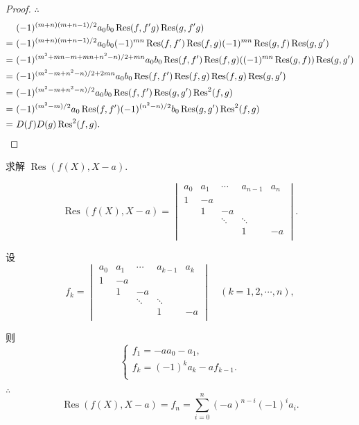 \documentclass[UTF8]{ctexart}
\begin{document}
\begin{proof}
    $\therefore$
    \begin{align*}
        & (-1)^{(m+n)(m+n-1)/2}a_0b_0\operatorname{Res}(f,f'g)\operatorname{Res}(g,f'g) \\
        =\  & (-1)^{(m+n)(m+n-1)/2}a_0b_0(-1)^{mn}\operatorname{Res}(f,f')\operatorname{Res}(f,g)(-1)^{mn}\operatorname{Res}(g,f)\operatorname{Res}(g,g') \\
        =\  & (-1)^{(m^2+mn-m+mn+n^2-n)/2+mn}a_0b_0\operatorname{Res}(f,f')\operatorname{Res}(f,g)((-1)^{mn}\operatorname{Res}(g,f))\operatorname{Res}(g,g') \\
        =\  & (-1)^{(m^2-m+n^2-n)/2+2mn}a_0b_0\operatorname{Res}(f,f')\operatorname{Res}(f,g)\operatorname{Res}(f,g)\operatorname{Res}(g,g') \\
        =\  & (-1)^{(m^2-m+n^2-n)/2}a_0b_0\operatorname{Res}(f,f')\operatorname{Res}(g,g')\operatorname{Res}^2(f,g) \\
        =\  & (-1)^{(m^2-m)/2}a_0\operatorname{Res}(f,f')(-1)^{(n^2-n)/2}b_0\operatorname{Res}(g,g')\operatorname{Res}^2(f,g) \\
        =\  & D(f)D(g)\operatorname{Res}^2(f,g).\qedhere
    \end{align*}
\end{proof}
\begin{exercise}\label{ex2.7}
    求解 $\operatorname{Res}(f(X),X-a)$.
\end{exercise}
\begin{solution}
    \[\operatorname{Res}(f(X),X-a)=\begin{vmatrix}
        a_0 & a_1 & \cdots & a_{n-1} & a_n \\
        1 & -a \\
        & 1 & -a \\
        && \ddots & \ddots \\
        &&& 1 & -a \\
    \end{vmatrix}.\]

    设
    \[f_k=\begin{vmatrix}
        a_0 & a_1 & \cdots & a_{k-1} & a_k \\
        1 & -a \\
        & 1 & -a \\
        && \ddots & \ddots \\
        &&& 1 & -a \\
    \end{vmatrix}\quad(k=1,2,\cdots,n),\]

    则
    \[\begin{cases}
        f_1=-aa_0-a_1, \\
        f_k=(-1)^ka_k-af_{k-1}. \\
    \end{cases}\]

    $\therefore$
    \[\operatorname{Res}(f(X),X-a)=f_n=\sum\limits_{i=0}^n(-a)^{n-i}(-1)^ia_i.\]
\end{solution}
\end{document}
